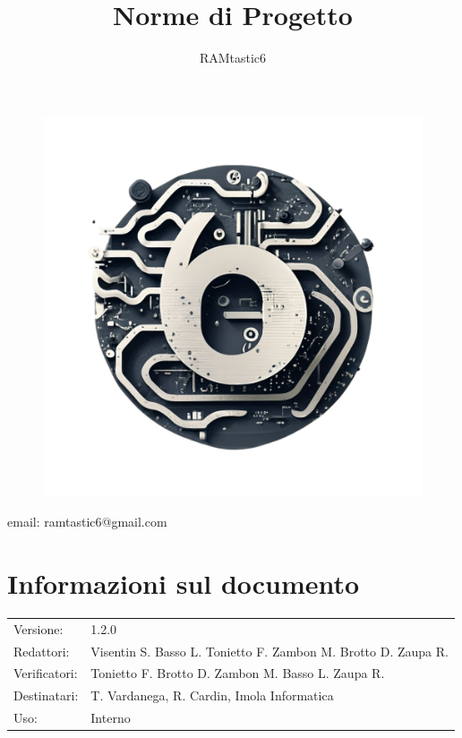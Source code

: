 \documentclass[12pt, oneside]{article}
\author{RAMtastic6}
\begin{document}
\thispagestyle{empty}
\title{Norme di Progetto}
\maketitle
\begin{figure}[h]
  \centering
  \includegraphics[scale=0.3]{logo.png}
\end{figure}
\begin{center}
    email: ramtastic6@gmail.com
\end{center}

\section*{Informazioni sul documento}
\begin{tabular}{ll}
Versione: & 1.2.0 \\
Redattori: &  Visentin S. Basso L. Tonietto F. Zambon M. Brotto D. Zaupa R.\\
Verificatori: & Tonietto F. Brotto D. Zambon M. Basso L. Zaupa R. \\
Destinatari: & T. Vardanega, R. Cardin, Imola Informatica \\
Uso: & Interno
\end{tabular}
\newpage
\end{document}
